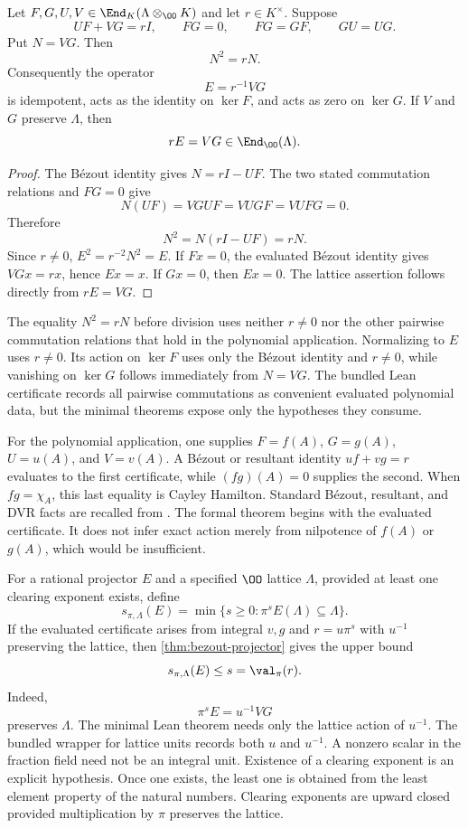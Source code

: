 \begin{theorem}\label{thm:bezout-projector}
Let $F,G,U,V\in\End_K(\Lambda\otimes_\OO K)$ and let $r\in K^\times$.
Suppose
\[
UF+VG=rI,
\qquad FG=0,
\qquad FG=GF,
\qquad GU=UG.
\]
Put $N=VG$. Then
\[
\boxed{N^2=rN.}
\]
Consequently the operator
\[
\boxed{
E=r^{-1}VG
}
\]
is idempotent, acts as the identity on $\ker F$, and acts as zero on
$\ker G$. If $V$ and $G$ preserve $\Lambda$, then
\[
rE=VG\in\End_\OO(\Lambda).
\]
\end{theorem}

\begin{proof}
The B\'ezout identity gives $N=rI-UF$. The two stated commutation relations
and $FG=0$ give
\[
N(UF)=VGUF=VUGF=VUFG=0.
\]
Therefore
\[
N^2=N(rI-UF)=rN.
\]
Since $r\ne0$, $E^2=r^{-2}N^2=E$. If $Fx=0$, the evaluated B\'ezout
identity gives $VGx=rx$, hence $Ex=x$. If $Gx=0$, then $Ex=0$.
The lattice assertion follows directly from $rE=VG$.
\end{proof}

The equality $N^2=rN$ before division uses neither $r\ne0$ nor the other
pairwise commutation relations that hold in the polynomial application.
Normalizing to $E$ uses $r\ne0$. Its action on $\ker F$ uses only the B\'ezout
identity and $r\ne0$, while vanishing on $\ker G$ follows immediately from $N=VG$.
The bundled Lean certificate records all pairwise commutations as convenient
evaluated polynomial data, but the minimal theorems expose only the hypotheses
they consume.

For the polynomial application, one supplies $F=f(A)$, $G=g(A)$,
$U=u(A)$, and $V=v(A)$. A B\'ezout or resultant identity
$uf+vg=r$ evaluates to the first certificate, while
$(fg)(A)=0$ supplies the second. When $fg=\chi_A$, this last equality is
Cayley Hamilton. Standard B\'ezout, resultant, and DVR facts are recalled
from \cite{Lang2002,Serre1979}. The formal theorem begins with the evaluated
certificate. It does not infer exact action merely from nilpotence of
$f(A)$ or $g(A)$, which would be insufficient.

\begin{definition}\label{def:separation-weight}
For a rational projector $E$ and a specified $\OO$ lattice $\Lambda$, provided
at least one clearing exponent exists, define
\[
s_{\pi,\Lambda}(E)
=
\min\{s\ge0:\pi^sE(\Lambda)\subseteq\Lambda\}.
\]
If the evaluated certificate arises from integral $v,g$ and
$r=u\pi^s$ with $u^{-1}$ preserving the lattice, then
\cref{thm:bezout-projector} gives the upper bound
\[
s_{\pi,\Lambda}(E)\le s=\val_\pi(r).
\]
Indeed,
\[
\boxed{\pi^sE=u^{-1}VG}
\]
preserves $\Lambda$. The minimal Lean theorem needs only the lattice action of
$u^{-1}$. The bundled wrapper for lattice units records both $u$ and $u^{-1}$.
A nonzero scalar in the fraction field need not be an integral unit.
Existence of a clearing exponent is an explicit hypothesis. Once one exists,
the least one is obtained from the least element property of the natural numbers.
Clearing exponents are upward closed provided multiplication by $\pi$
preserves the lattice.
\end{definition}

